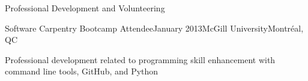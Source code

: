 \documentclass{resume} %
\begin{document}
\begin{rSection}{Professional Development and Volunteering}
	
	\begin{rSubsection}{Software Carpentry Bootcamp Attendee}{January 2013}{McGill University}{Montr\'eal, QC}
	\item Professional development related to programming skill enhancement with command line tools, GitHub, and Python
	\end{rSubsection}
	
	
	
	
	

\end{rSection}


\end{document}
